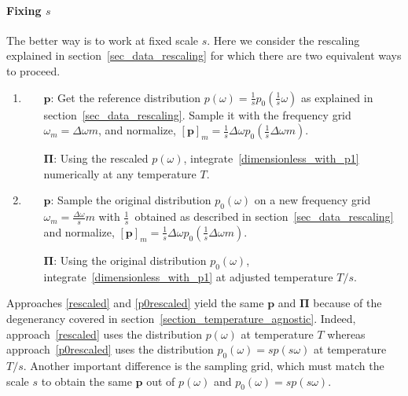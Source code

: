 \documentclass[notitlepage,11pt,nofootinbib]{revtex4-1}
\renewcommand{\vec}[1]{\bm{#1}}
\begin{document}
\paragraph*{Fixing $s$}
The better way is to work at fixed scale $s$. Here we consider the rescaling explained in section~\ref{sec_data_rescaling} for which there are two equivalent ways to proceed.
\begin{enumerate}[resume]
\item \label{rescaled}
\begin{itemize}
    \item[$\vec p$:] Get the reference distribution $p(\omega) = \tfrac{1}{s}p_0(\tfrac{1}{s}\omega)$ as explained in section~\ref{sec_data_rescaling}. Sample it with the frequency grid $\omega_m=\Delta\omega m$, and normalize, $[\vec p]_m = \frac{1}{s}\Delta\omega p_0(\frac{1}{s}\Delta\omega m)$.
    \item[$\vec \Pi$:] Using the rescaled $p(\omega)$, integrate~\eqref{dimensionless_with_p1} numerically at any temperature $T$.
\end{itemize}
\item \label{p0rescaled}
\begin{itemize}
    \item[$\vec p$:] Sample the original distribution $p_0(\omega)$ on a new frequency grid $\omega_m=\frac{\Delta\omega}{s} m$ with $\frac{1}{s}$~obtained as described in section~\ref{sec_data_rescaling} and normalize, $[\vec p]_m = \frac{1}{s}\Delta\omega p_0(\frac{1}{s}\Delta\omega m)$.

    \item[$\vec \Pi$:] Using the original distribution $p_0(\omega)$, integrate~\eqref{dimensionless_with_p1} at adjusted temperature $T/s$.
\end{itemize}
\end{enumerate}
Approaches \ref{rescaled} and \ref{p0rescaled} yield the same $\vec p$ and $\vec \Pi$ because of the degenerancy covered in section~\ref{section_temperature_agnostic}. Indeed, approach~\ref{rescaled} uses the distribution $p(\omega)$ at temperature $T$ whereas approach~\ref{p0rescaled} uses the distribution $p_0(\omega)=sp(s\omega)$ at temperature $T/s$. Another important difference is the sampling grid, which must match the scale $s$ to obtain the same $\vec p$ out of $p(\omega)$ and $p_0(\omega)=sp(s\omega)$.
\end{document}
